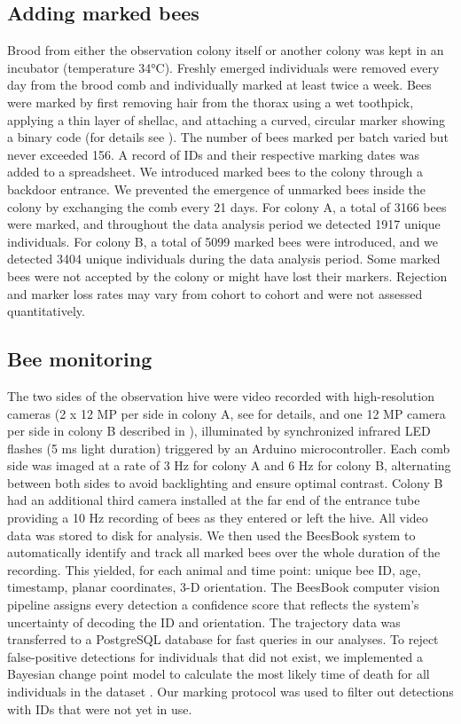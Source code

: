 \documentclass{article}
\begin{document}
\subsection*{Adding marked bees}
Brood from either the observation colony itself or another colony was kept in an incubator (temperature 34°C). Freshly emerged individuals were removed every day from the brood comb and individually marked at least twice a week. Bees were marked by first removing hair from the thorax using a wet toothpick, applying a thin layer of shellac, and attaching a curved, circular marker showing a binary code (for details see \cite{wario_automatic_2015}). The number of bees marked per batch varied but never exceeded 156. A record of IDs and their respective marking dates was added to a spreadsheet. We introduced marked bees to the colony through a backdoor entrance. We prevented the emergence of unmarked bees inside the colony by exchanging the comb every 21 days. For colony A, a total of 3166 bees were marked, and throughout the data analysis period we detected 1917 unique individuals. For colony B, a total of 5099 marked bees were introduced, and we detected 3404 unique individuals during the data analysis period. Some marked bees were not accepted by the colony or might have lost their markers. Rejection and marker loss rates may vary from cohort to cohort and were not assessed quantitatively.

\subsection*{Bee monitoring}
The two sides of the observation hive were video recorded with high-resolution cameras (2 x 12 MP per side in colony A, see \cite{wario_automatic_2015} for details, and one 12 MP camera per side in colony B described in \cite{wild_social_2021}), illuminated by synchronized infrared LED flashes (5 ms light duration) triggered by an Arduino microcontroller. Each comb side was imaged at a rate of 3 Hz for colony A and 6 Hz for colony B, alternating between both sides to avoid backlighting and ensure optimal contrast. Colony B had an additional third camera installed at the far end of the entrance tube providing a 10 Hz recording of bees as they entered or left the hive. All video data was stored to disk for analysis. We then used the BeesBook system \cite{wario_automatic_2015, wario_automatic_2017, sixt_rendergan:_2018, wild_automatic_2018, boenisch_tracking_2018, wild_social_2021, dormagen_machine_2023} to automatically identify and track all marked bees over the whole duration of the recording. This yielded, for each animal and time point: unique bee ID, age, timestamp, planar coordinates, 3-D orientation. The BeesBook computer vision pipeline assigns every detection a confidence score that reflects the system’s uncertainty of decoding the ID and orientation. The trajectory data was transferred to a PostgreSQL database for fast queries in our analyses. To reject false-positive detections for individuals that did not exist, we implemented a Bayesian change point model to calculate the most likely time of death for all individuals in the dataset \cite{wild_social_2021}. Our marking protocol was used to filter out detections with IDs that were not yet in use.
\end{document}
